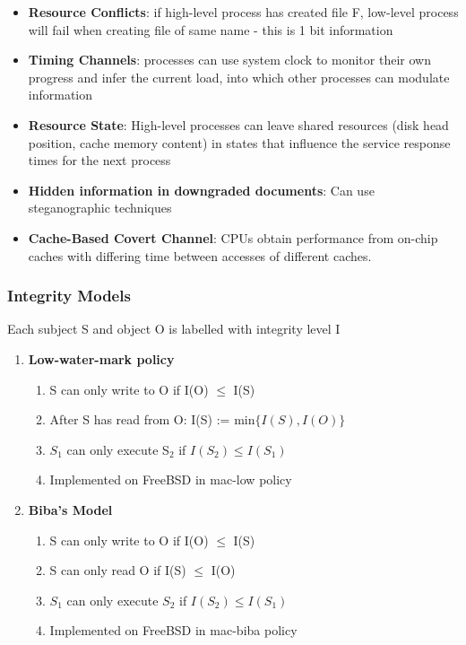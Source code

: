 \documentclass{article}
\newenvironment{example}{\par\color{brown}}{\par}
\begin{document}
\begin{example}
	\begin{itemize}
		\item \textbf{Resource Conflicts}: if high-level process has created file F, low-level process will fail when creating file of same name - this is 1 bit information
		
		\item \textbf{Timing Channels}: processes can use system clock to monitor their own progress and infer the current load, into which other processes can modulate information
		
		\item \textbf{Resource State}: High-level processes can leave shared resources (disk head position, cache memory content) in states that influence the service response times for the next process
		
		\item \textbf{Hidden information in downgraded documents}: Can use steganographic techniques
		
		\item \textbf{Cache-Based Covert Channel}: CPUs obtain performance from on-chip caches with differing time between accesses of different caches.
	\end{itemize}
\end{example}


\subsubsection{Integrity Models}
Each subject S and object O is labelled with integrity level I

\begin{enumerate}
	\item \textbf{Low-water-mark policy}
	\begin{enumerate}
		\item S can only write to O if I(O) $\leq$ I(S)
		\item After S has read from O: I(S) := min$\{ I(S), I(O) \}$
		\item $S_{1}$ can only execute S$_{2}$ if $I(S_{2}) \leq I(S_{1})$
		\item Implemented on FreeBSD in mac-low policy
	\end{enumerate}
	\item \textbf{Biba's Model}
	\begin{enumerate}
		\item S can only write to O if I(O) $\leq$ I(S)
		\item S can only read O if I(S) $\leq$ I(O)
		\item $S_{1}$ can only execute $S_{2}$ if $I(S_{2}) \leq I(S_{1})$
		\item Implemented on FreeBSD in mac-biba policy
	\end{enumerate}
\end{enumerate}
\end{document}
